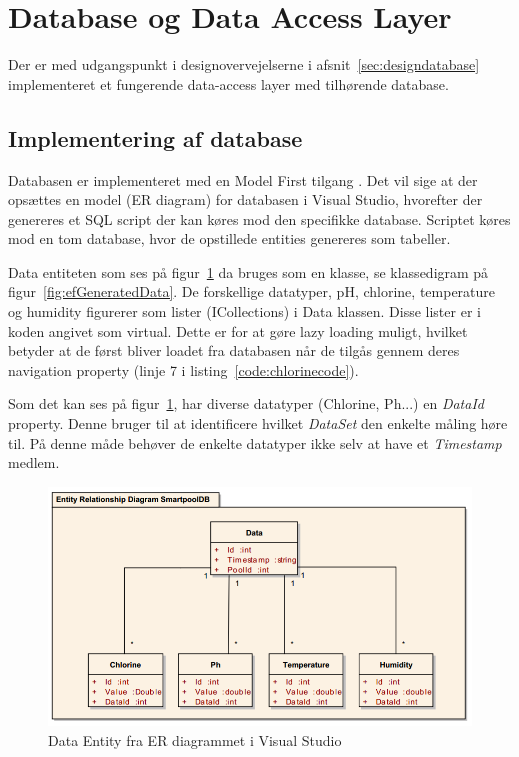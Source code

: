 \section{Database og Data Access Layer}

Der er med udgangspunkt i designovervejelserne i afsnit~\ref{sec:designdatabase} implementeret et fungerende data-access layer med tilhørende database.

\subsection{Implementering af database}

Databasen er implementeret med en Model First tilgang \cite{microsoftdatadevelopercenter2016}. Det vil sige at der opsættes en model (ER diagram) for databasen i Visual Studio, hvorefter der genereres et SQL script der kan køres mod den specifikke database. Scriptet køres mod en tom database, hvor de opstillede entities genereres som tabeller.

Data entiteten som ses på figur~\ref{fig:datasetentity} da bruges som en klasse, se klassedigram på figur~\ref{fig:efGeneratedData}. De forskellige datatyper, pH, chlorine, temperature og humidity figurerer som lister (ICollections) i Data klassen. Disse lister er i koden angivet som virtual. Dette er for at gøre lazy loading muligt, hvilket betyder at de først bliver loadet fra databasen når de tilgås gennem deres navigation property \cite{microsoftdevelopernetwork2016} (linje 7 i listing~\ref{code:chlorinecode}).

Som det kan ses på figur~\ref{fig:datasetentity}, har diverse datatyper (Chlorine, Ph...) en \textit{DataId} property. Denne bruger til at identificere hvilket \textit{DataSet} den enkelte måling høre til. På denne måde behøver de enkelte datatyper ikke selv at have et \textit{Timestamp} medlem. 

\begin{figure}[h]
	\centering
	\includegraphics[width=0.8\linewidth]{figs/implementering/datasetentity.png}
	\caption{Data Entity fra ER diagrammet i Visual Studio}
	\label{fig:datasetentity}
\end{figure}


